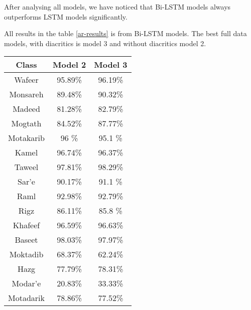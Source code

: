 \begin{center}
\begin{tabular}{c c c c c c c}
     \bottomrule
 \end{tabular}
\label{ar-results}
\end{center}


After analysing all models, we have noticed  that Bi-LSTM models always outperforms
LSTM models significantly.

All results in the table \ref{ar-results} is from Bi-LSTM models. The best full
data models, with diacritics is model 3 and without diacritics model 2.

\begin{center}
\begin{tabular}{|c|c|c|} 
\hline
\textbf{Class} & \textbf{Model 2} & \textbf{Model 3} \\ 
\hline
   Wafeer     & 95.89\% & 96.19\% \\
   Monsareh   & 89.48\% & 90.32\% \\
   Madeed     & 81.28\% & 82.79\% \\
   Mogtath    & 84.52\% & 87.77\% \\
   Motakarib  & 96   \% & 95.1 \% \\
   Kamel      & 96.74\% & 96.37\% \\
   Taweel     & 97.81\% & 98.29\% \\
   Sar'e      & 90.17\% & 91.1 \% \\
   Raml       & 92.98\% & 92.79\% \\
   Rigz       & 86.11\% & 85.8 \% \\
   Khafeef    & 96.59\% & 96.63\% \\
   Baseet     & 98.03\% & 97.97\% \\
   Moktadib   & 68.37\% & 62.24\% \\
   Hazg       & 77.79\% & 78.31\% \\
   Modar'e    & 20.83\% & 33.33\% \\
   Motadarik  & 78.86\% & 77.52\% \\
\hline
\end{tabular}
\end{center}



















